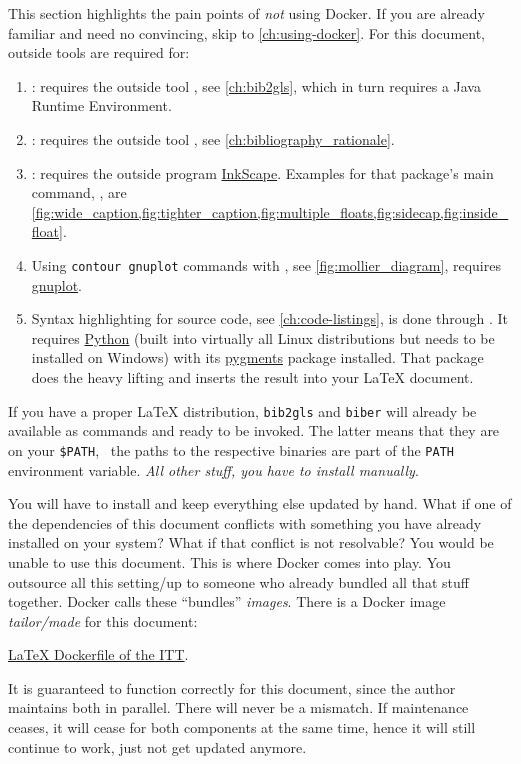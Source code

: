 This section highlights the pain points of \emph{not} using Docker.
If you are already familiar and need no convincing, skip to \cref{ch:using-docker}.
For this document, outside tools are required for:
\begin{enumerate}
  \item {}: requires the outside tool
        , see \cref{ch:bib2gls}, which in turn requires
        a Java Runtime Environment.
  \item {}: requires the outside tool ,
        see \cref{ch:bibliography_rationale}.
  \item {}: requires the outside program
        \href{https://inkscape.org/}{InkScape}.
        Examples for that package's main command, \verb||, are
        \cref{fig:wide_caption,fig:tighter_caption,fig:multiple_floats,fig:sidecap,fig:inside_float}.
  \item Using \texttt{contour gnuplot} commands with , see
        \cref{fig:mollier_diagram}, requires
        \href{http://www.gnuplot.info/download.html}{gnuplot}.
  \item Syntax highlighting for source code, see \cref{ch:code-listings},
        is done through .
        It requires \href{https://www.python.org/}{Python} (built into virtually all Linux
        distributions but needs to be installed on Windows) with its
        \href{https://pypi.org/project/Pygments/}{pygments} package installed.
        That package does the heavy lifting and  inserts the result
        into your \LaTeX{} document.
\end{enumerate}

If you have a proper \LaTeX{} distribution, \texttt{bib2gls} and \texttt{biber}
will already be available as commands and ready to be invoked.
The latter means that they are on your \texttt{\$PATH}, \ the paths to
the respective binaries are part of the \texttt{PATH} environment variable.
\emph{All other stuff, you have to install manually}.

You will have to install and keep everything else updated by hand.
What if one of the dependencies of this document conflicts with something you have already
installed on your system?
What if that conflict is not resolvable?
You would be unable to use this document.
This is where Docker comes into play.
You outsource all this setting\-/up to someone who already bundled all that stuff together.
Docker calls these \enquote{bundles} \emph{images}.
There is a Docker image \emph{tailor\-/made} for this document:
\begin{center}
  \href{https://collaborating.tuhh.de/m21/public/theses/latex_dockerfile}{\LaTeX{} Dockerfile of the ITT}.
\end{center}
It is guaranteed to function correctly for this document, since the author maintains both
in parallel.
There will never be a mismatch.
If maintenance ceases, it will cease for both components at the same time, hence it will
still continue to work, just not get updated anymore.

